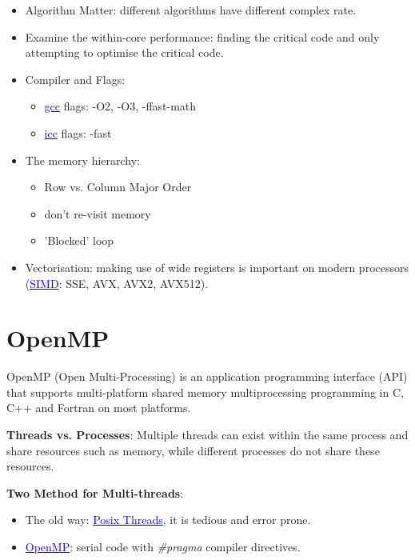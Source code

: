 \documentclass{article}
\begin{document}
\begin{itemize}
    \item Algorithm Matter: different algorithms have different complex rate.
    \item Examine the within-core performance: finding the critical code and only attempting to optimise the critical code.
    \item Compiler and Flags:
    \begin{itemize}
        \item \href{https://gcc.gnu.org/onlinedocs/gcc/index.html}{\textcolor{blue}{gcc}} flags: -O2, -O3, -ffast-math
        \item \href{http://scv.bu.edu/computation/bladecenter/manpages/icc.html}{\textcolor{blue}{icc}} flags: -fast
    \end{itemize}
    \item The memory hierarchy:
    \begin{itemize}
        \item Row vs. Column Major Order
        \item don’t re-visit memory
        \item 'Blocked' loop
    \end{itemize}
    \item Vectorisation: making use of wide registers is important on modern processors (\href{https://software.intel.com/sites/landingpage/IntrinsicsGuide/}{\textcolor{blue}{SIMD}}: SSE, AVX, AVX2, AVX512).
\end{itemize}


\section{OpenMP}

OpenMP (Open Multi-Processing) is an application programming interface (API) that supports multi-platform shared memory multiprocessing programming in C, C++ and Fortran on most platforms.

\textbf{Threads vs. Processes}: Multiple threads can exist within the same process and share resources such as memory, while different processes do not share these resources.

\textbf{Two Method for Multi-threads}:

\begin{itemize}
    \item The old way: \href{https://computing.llnl.gov/tutorials/pthreads/}{\textcolor{blue}{Posix Threads}}, it is tedious and error prone.
    \item \href{http://www.openmp.org/}{\textcolor{blue}{OpenMP}}: serial code with \textit{\#pragma} compiler directives.
\end{itemize}
\end{document}
